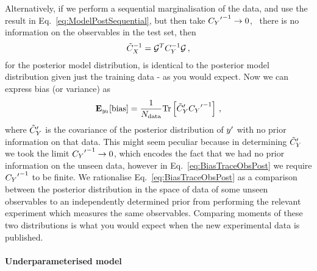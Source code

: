 Alternatively, if we perform a sequential marginalisation of
the data, and use the result in Eq.~\ref{eq:ModelPostSequential}, but
then take ${{C_{Y}}^{\prime}}^{-1} \to 0$, \ie\ there is no information
on the observables in the test set, then
\begin{equation}
    \tilde{C}_X^{-1} = \mathcal{G}^T C_{Y}^{-1} \mathcal{G} \, ,
\end{equation}
for the posterior model distribution, is identical to the posterior model
distribution given just the training data - as you would expect.
Now we can express bias (or variance) as
\begin{equation}\label{eq:BiasTraceObsPost}
    \mathbf{E}_{y_0}[{\rm bias}] = \frac{1}{N_{\rm data}}
    {\rm Tr} \left[
        {{\tilde{C}_Y}^{\prime}}
        {{C_{Y}}^{\prime}}^{-1}
    \right] \, ,
\end{equation}
where ${{\tilde{C}_Y}^{\prime}}$ is the covariance of the posterior distribution of
${{y}^{\prime}}$ with no prior information on that data. This might seem
peculiar because in determining ${{\tilde{C}_Y}^{\prime}}$ we took the limit
${{C_{Y}}^{\prime}}^{-1} \to 0$, which encodes the fact that we had no prior
information on the unseen data, however in Eq.~\ref{eq:BiasTraceObsPost} we
require ${{C_{Y}}^{\prime}}^{-1}$ to be finite. We rationalise
Eq.~\ref{eq:BiasTraceObsPost} as a comparison between the posterior distribution
in the space of data of some unseen observables to an independently determined
prior from performing the relevant experiment which measures the same
observables. Comparing moments of these two distributions is what you would
expect when the new experimental data is published.


\paragraph{Underparameterised model}

